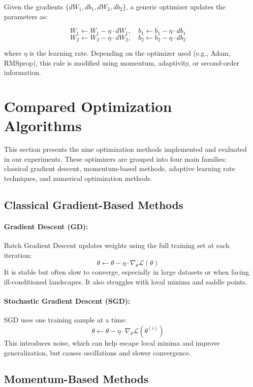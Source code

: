 \documentclass[12pt]{article}
\begin{document}
Given the gradients $\{dW_1, db_1, dW_2, db_2\}$, a generic optimizer updates the parameters as:

\[
W_1 \leftarrow W_1 - \eta \cdot dW_1, \quad b_1 \leftarrow b_1 - \eta \cdot db_1
\]
\[
W_2 \leftarrow W_2 - \eta \cdot dW_2, \quad b_2 \leftarrow b_2 - \eta \cdot db_2
\]

where $\eta$ is the learning rate. Depending on the optimizer used (e.g., Adam, RMSprop), this rule is modified using momentum, adaptivity, or second-order information.

\section{Compared Optimization Algorithms}

This section presents the nine optimization methods implemented and evaluated in our experiments. These optimizers are grouped into four main families: classical gradient descent, momentum-based methods, adaptive learning rate techniques, and numerical optimization methods.

\subsection{Classical Gradient-Based Methods}

\paragraph{Gradient Descent (GD):}  
Batch Gradient Descent updates weights using the full training set at each iteration:
\[
\theta \leftarrow \theta - \eta \cdot \nabla_{\theta} \mathcal{L}(\theta)
\]
It is stable but often slow to converge, especially in large datasets or when facing ill-conditioned landscapes. It also struggles with local minima and saddle points.

\paragraph{Stochastic Gradient Descent (SGD):}  
SGD uses one training sample at a time:
\[
\theta \leftarrow \theta - \eta \cdot \nabla_{\theta} \mathcal{L}(\theta^{(i)})
\]
This introduces noise, which can help escape local minima and improve generalization, but causes oscillations and slower convergence.

\subsection{Momentum-Based Methods}
\end{document}
